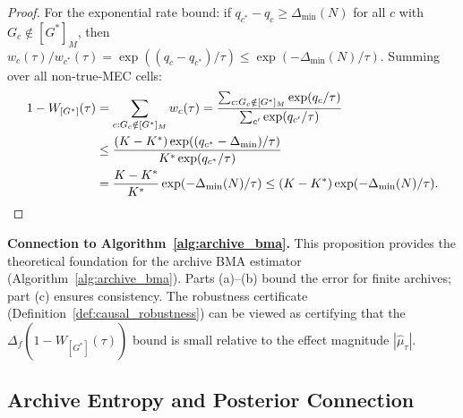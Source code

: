 \documentclass{article}
\theoremstyle{definition}
\theoremstyle{plain}
\theoremstyle{remark}
\begin{document}
\begin{proof}
For the exponential rate bound: if $q_{c^*} - q_c \geq \Delta_{\min}(N)$ for all $c$ with
$G_c \notin [G^*]_M$, then $w_c(\tau)/w_{c^*}(\tau) = \exp((q_c - q_{c^*})/\tau)
\leq \exp(-\Delta_{\min}(N)/\tau)$. Summing over all non-true-MEC cells:
\begin{align}
  1 - W_{[G^*]}(\tau) &= \sum_{c : G_c \notin [G^*]_M} w_c(\tau)
  = \frac{\sum_{c : G_c \notin [G^*]_M} \exp(q_c/\tau)}{\sum_{c'} \exp(q_{c'}/\tau)} \\
  &\leq \frac{(K - K^*) \exp((q_{c^*} - \Delta_{\min})/\tau)}
  {K^* \exp(q_{c^*}/\tau)} \notag \\
  &= \frac{K - K^*}{K^*} \exp(-\Delta_{\min}(N)/\tau)
  \leq (K - K^*) \exp(-\Delta_{\min}(N)/\tau). \notag
\end{align}
\end{proof}

\textbf{Connection to Algorithm~\ref{alg:archive_bma}.} This proposition provides the
theoretical foundation for the archive BMA estimator (Algorithm~\ref{alg:archive_bma}).
Parts (a)--(b) bound the error for finite archives; part (c) ensures consistency.
The robustness certificate (Definition~\ref{def:causal_robustness}) can be viewed as
certifying that the $\Delta_f(1 - W_{[G^*]}(\tau))$ bound is small relative to the
effect magnitude $|\hat{\mu}_\tau|$.


\subsection{Archive Entropy and Posterior Connection}
\label{subsec:archive_entropy}
\end{document}

